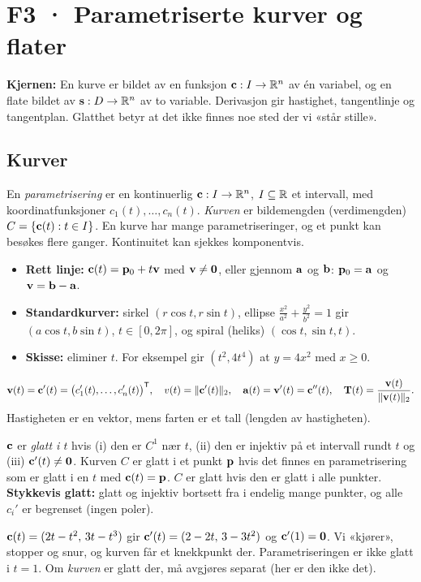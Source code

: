\section{F3 · Parametriserte kurver og flater}

\textbf{Kjernen:} En kurve er bildet av en funksjon $\mathbf{c}:I\to\mathbb{R}^n$ av én variabel, og en flate bildet av $\mathbf{s}:D\to\mathbb{R}^n$ av to variable. Derivasjon gir hastighet, tangentlinje og tangentplan. Glatthet betyr at det ikke finnes noe sted der vi «står stille».

\subsection{Kurver}
\begin{defn}
En \emph{parametrisering} er en kontinuerlig $\mathbf{c}:I\to\mathbb{R}^n$, $I\subseteq\mathbb{R}$ et intervall, med koordinatfunksjoner $c_1(t),\dots,c_n(t)$. \emph{Kurven} er bildemengden (verdimengden) $C=\{\mathbf{c}(t):t\in I\}$. En kurve har mange parametriseringer, og et punkt kan besøkes flere ganger. Kontinuitet kan sjekkes komponentvis.
\end{defn}
\begin{itemize}
  \item \textbf{Rett linje:} $\mathbf{c}(t)=\mathbf{p}_0+t\mathbf{v}$ med $\mathbf{v}\neq\mathbf{0}$, eller gjennom $\mathbf{a}$ og $\mathbf{b}$: $\mathbf{p}_0=\mathbf{a}$ og $\mathbf{v}=\mathbf{b}-\mathbf{a}$.
  \item \textbf{Standardkurver:} sirkel $(r\cos t,r\sin t)$, ellipse $\tfrac{x^2}{a^2}+\tfrac{y^2}{b^2}=1$ gir $(a\cos t,b\sin t)$, $t\in[0,2\pi]$, og spiral (heliks) $(\cos t,\sin t,t)$.
  \item \textbf{Skisse:} eliminer $t$. For eksempel gir $(t^2,4t^4)$ at $y=4x^2$ med $x\ge0$.
\end{itemize}

\begin{defn}
\[
\mathbf{v}(t)=\mathbf{c}'(t)=\bigl(c_1'(t),\dots,c_n'(t)\bigr)^{\mathsf{T}},\quad v(t)=\lVert \mathbf{c}'(t)\rVert_2,\quad \mathbf{a}(t)=\mathbf{v}'(t)=\mathbf{c}''(t),\quad \mathbf{T}(t)=\frac{\mathbf{v}(t)}{\lVert \mathbf{v}(t)\rVert_2}.
\]
Hastigheten er en vektor, mens farten er et tall (lengden av hastigheten).
\end{defn}

\begin{defn}
$\mathbf{c}$ er \emph{glatt i $t$} hvis (i) den er $C^1$ nær $t$, (ii) den er injektiv på et intervall rundt $t$ og (iii) $\mathbf{c}'(t)\neq\mathbf{0}$.
Kurven $C$ er glatt i et punkt $\mathbf{p}$ hvis det finnes en parametrisering som er glatt i en $t$ med $\mathbf{c}(t)=\mathbf{p}$. $C$ er glatt hvis den er glatt i alle punkter.\\
\textbf{Stykkevis glatt:} glatt og injektiv bortsett fra i endelig mange punkter, og alle $c_i'$ er begrenset (ingen poler).
\end{defn}
\begin{eksempel}
$\mathbf{c}(t)=(2t-t^2,\,3t-t^3)$ gir $\mathbf{c}'(t)=(2-2t,\,3-3t^2)$ og $\mathbf{c}'(1)=\mathbf{0}$. Vi «kjører», stopper og snur, og kurven får et knekkpunkt der. Parametriseringen er ikke glatt i $t=1$. Om \emph{kurven} er glatt der, må avgjøres separat (her er den ikke det).
\end{eksempel}

